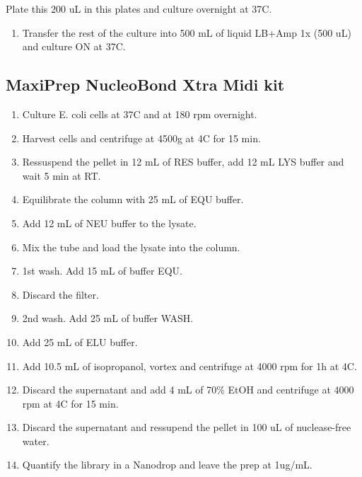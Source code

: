 \documentclass[11pt]{article}
\begin{document}
Plate this 200 uL in this plates and culture overnight at 37C.\\

\begin{enumerate}
\item Transfer the rest of the culture into 500 mL of liquid LB+Amp 1x (500 uL) and culture ON at 37C.\\
\end{enumerate}

\subsection{MaxiPrep NucleoBond Xtra Midi kit}
\label{sec:orgdecb077}
\begin{enumerate}
\item Culture E. coli cells at 37C and at 180 rpm overnight.\\
\item Harvest cells and centrifuge at 4500g at 4C for 15 min.\\
\item Ressuspend the pellet in 12 mL of RES buffer, add 12 mL LYS buffer and wait 5 min at RT.\\
\item Equilibrate the column with 25 mL of EQU buffer.\\
\item Add 12 mL of NEU buffer to the lysate.\\
\item Mix the tube and load the lysate into the column.\\
\item 1st wash. Add 15 mL of buffer EQU.\\
\item Discard the filter.\\
\item 2nd wash. Add 25 mL of buffer WASH.\\
\item Add 25 mL of ELU buffer.\\
\item Add 10.5 mL of isopropanol, vortex and centrifuge at 4000 rpm for 1h at 4C.\\
\item Discard the supernatant and add 4 mL of 70\% EtOH and centrifuge at 4000 rpm at 4C for 15 min.\\
\item Discard the supernatant and ressupend the pellet in 100 uL of nuclease-free water.\\
\item Quantify the library in a Nanodrop and leave the prep at 1ug/mL.\\
\end{enumerate}
\end{document}
